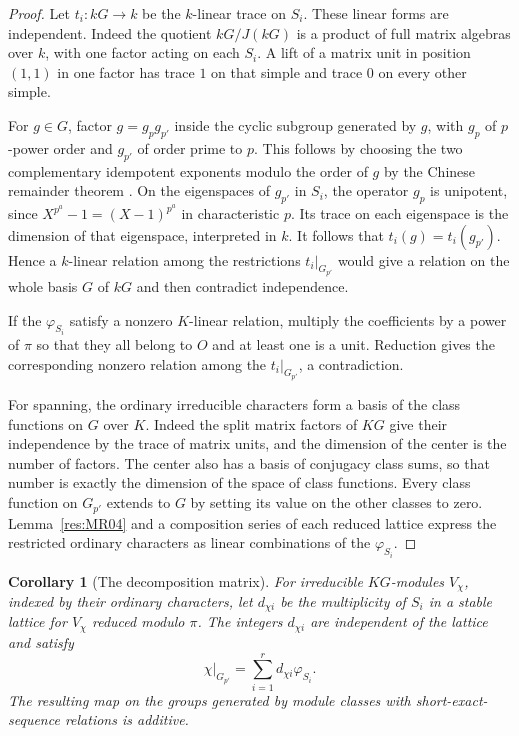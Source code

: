 \documentclass[11pt,oneside,openany]{book}
\newtheorem{corollary}[theorem]{Corollary}
\theoremstyle{definition}
\theoremstyle{remark}
\begin{document}
\begin{proof}
Let \(t_i:kG\to k\) be the \(k\)-linear trace on \(S_i\).
These linear forms are independent. Indeed the quotient
\(kG/J(kG)\) is a product of full matrix algebras over \(k\),
with one factor acting on each \(S_i\). A lift of a matrix unit
in position \((1,1)\) in one factor has trace \(1\) on that
simple and trace \(0\) on every other simple.

For \(g\in G\), factor \(g=g_p g_{p'}\) inside the cyclic
subgroup generated by \(g\), with \(g_p\) of \(p\)-power
order and \(g_{p'}\) of order prime to \(p\). This follows by
choosing the two complementary idempotent exponents modulo
the order of \(g\) by the Chinese remainder theorem
\cite[PDF p.~66]{mg-d07}.
On the eigenspaces of \(g_{p'}\) in \(S_i\), the operator
\(g_p\) is unipotent, since \(X^{p^a}-1=(X-1)^{p^a}\)
in characteristic \(p\). Its trace on each eigenspace is the
dimension of that eigenspace, interpreted in \(k\). It follows
that \(t_i(g)=t_i(g_{p'})\). Hence a \(k\)-linear relation
among the restrictions \(t_i|_{G_{p'}}\) would give a relation
on the whole basis \(G\) of \(kG\) and then contradict independence.

If the \(\varphi_{S_i}\) satisfy a nonzero \(K\)-linear
relation, multiply the coefficients by a power of \(\pi\)
so that they all belong to \(O\) and at least one is a unit.
Reduction gives the corresponding nonzero relation among the
\(t_i|_{G_{p'}}\), a contradiction.

For spanning, the ordinary irreducible characters form a basis
of the class functions on \(G\) over \(K\). Indeed the split
matrix factors of \(KG\) give their independence by the trace
of matrix units, and the dimension of the center is the
number of factors. The center also has a basis of conjugacy
class sums, so that number is exactly the dimension of the
space of class functions. Every class function on \(G_{p'}\)
extends to \(G\) by setting its value on the other classes to
zero. Lemma~\ref{res:MR04} and a composition series of each
reduced lattice express the restricted ordinary characters
as linear combinations of the \(\varphi_{S_i}\).
\end{proof}

\begin{corollary}[The decomposition matrix]
\label{res:MR06}
For irreducible \(KG\)-modules \(V_\chi\), indexed by their
ordinary characters, let \(d_{\chi i}\) be the multiplicity
of \(S_i\) in a stable lattice for \(V_\chi\) reduced modulo
\(\pi\). The integers \(d_{\chi i}\) are independent of
the lattice and satisfy
\[
  \chi|_{G_{p'}}=\sum_{i=1}^{r} d_{\chi i}\varphi_{S_i}.
\]
The resulting map on the groups generated by module classes
with short-exact-sequence relations is additive.
\end{corollary}
\end{document}
